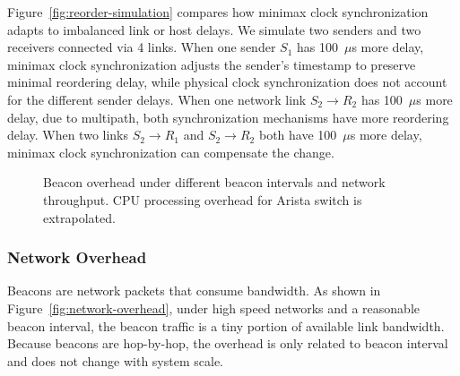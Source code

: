 Figure~\ref{fig:reorder-simulation} compares how minimax clock synchronization adapts to imbalanced link or host delays. We simulate two senders and two receivers connected via 4 links. When one sender $S_1$ has 100~$\mu$s more delay, minimax clock synchronization adjusts the sender's timestamp to preserve minimal reordering delay, while physical clock synchronization does not account for the different sender delays. When one network link $S_2 \rightarrow R_2$ has 100~$\mu$s more delay, due to multipath, both synchronization mechanisms have more reordering delay. When two links $S_2 \rightarrow R_1$ and $S_2 \rightarrow R_2$ both have 100~$\mu$s more delay, minimax clock synchronization can compensate the change.



\begin{figure}[t]
\centering
	\hspace{0.01\textwidth}
\caption{Beacon overhead under different beacon intervals and network throughput. CPU processing overhead for Arista switch is extrapolated.}
\label{fig:overhead}
\end{figure}




\subsubsection{Network Overhead}
\label{sec:eval-overhead}


Beacons are network packets that consume bandwidth.
As shown in Figure~\ref{fig:network-overhead}, under high speed networks and a reasonable beacon interval, the beacon traffic is a tiny portion of available link bandwidth. Because beacons are hop-by-hop, the overhead is only related to beacon interval and does not change with system scale.

